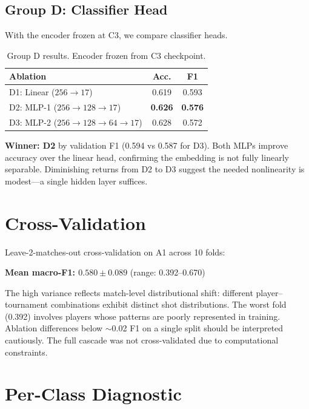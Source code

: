 \documentclass[11pt,a4paper]{article}
\begin{document}
\subsection{Group D: Classifier Head}

With the encoder frozen at C3, we compare classifier heads.

\begin{table}[H]
\centering
\caption{Group D results. Encoder frozen from C3 checkpoint.}
\label{tab:groupD}
\begin{tabular}{@{}lcc@{}}
\toprule
\textbf{Ablation} & \textbf{Acc.} & \textbf{F1} \\
\midrule
D1: Linear ($256 \to 17$) & 0.619 & 0.593 \\
D2: MLP-1 ($256 \to 128 \to 17$) & \textbf{0.626} & \textbf{0.576} \\
D3: MLP-2 ($256 \to 128 \to 64 \to 17$) & 0.628 & 0.572 \\
\bottomrule
\end{tabular}
\end{table}

\textbf{Winner: D2} by validation F1 (0.594 vs 0.587 for D3). Both MLPs improve accuracy over the linear head, confirming the embedding is not fully linearly separable. Diminishing returns from D2 to D3 suggest the needed nonlinearity is modest---a single hidden layer suffices.

\section{Cross-Validation}

Leave-2-matches-out cross-validation on A1 across 10 folds:

\begin{center}
\textbf{Mean macro-F1: $0.580 \pm 0.089$} \quad (range: 0.392--0.670)
\end{center}

The high variance reflects match-level distributional shift: different player--tournament combinations exhibit distinct shot distributions. The worst fold (0.392) involves players whose patterns are poorly represented in training. Ablation differences below $\sim$0.02 F1 on a single split should be interpreted cautiously. The full cascade was not cross-validated due to computational constraints.

\section{Per-Class Diagnostic}
\label{sec:perclass}
\end{document}
